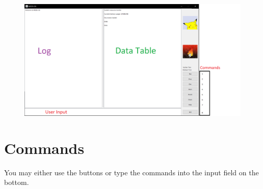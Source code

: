 \documentclass[10pt]{article}
\title{
\vspace{2in}
\textmd{\textbf{\projecttitle} \\}
\vspace{5in}
}
\author{\textbf{\hmwkAuthorName}}
\date{} %
\begin{document}
\maketitle








\newpage

\tableofcontents

\newpage












\begin{figure}[H]
	\centering
	\includegraphics[width=\linewidth]{Untitled}
\end{figure}


\section{Commands}

You may either use the buttons or type the commands into the input field on the bottom.
\end{document}
